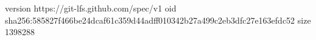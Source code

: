 version https://git-lfs.github.com/spec/v1
oid sha256:585827f466be24dcaf61c359d44adff010342b27a499c2eb3dfc27e163efdc52
size 1398288
